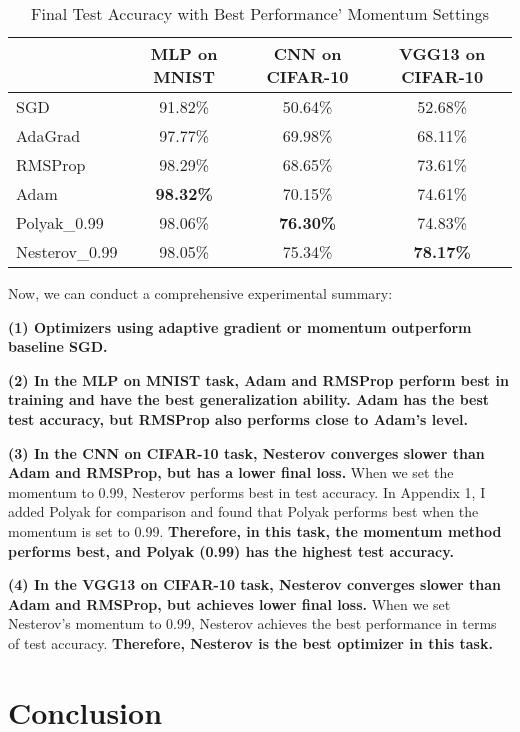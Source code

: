 \documentclass[12pt]{article}
\begin{document}
\begin{table}[H]
\centering
\caption{Final Test Accuracy with Best Performance' Momentum Settings}
\label{tab:comprehensive_comparison}
\begin{tabular}{|l|c|c|c|}
\hline
             & MLP on MNIST & CNN on CIFAR-10 & VGG13 on CIFAR-10 \\ \hline
SGD          & 91.82\%      & 50.64\%         & 52.68\%           \\ \hline
AdaGrad      & 97.77\%      & 69.98\%         & 68.11\%           \\ \hline
RMSProp      & 98.29\%      & 68.65\%         & 73.61\%           \\ \hline
Adam         & \textbf{98.32\%} & 70.15\%         & 74.61\%    \\ \hline
Polyak\_0.99   & 98.06\%      & \textbf{76.30\%}  & 74.83\%           \\ \hline
Nesterov\_0.99 & 98.05\%      & 75.34\%         & \textbf{78.17\%}           \\ \hline
\end{tabular}
\end{table}

Now, we can conduct a comprehensive experimental summary:

\textbf{(1) Optimizers using adaptive gradient or momentum outperform baseline SGD.}

\textbf{(2) In the MLP on MNIST task, Adam and RMSProp perform best in training and have the best generalization ability. Adam has the best test accuracy, but RMSProp also performs close to Adam's level.}

\textbf{(3) In the CNN on CIFAR-10 task, Nesterov converges slower than Adam and RMSProp, but has a lower final loss.} When we set the momentum to 0.99, Nesterov performs best in test accuracy. In Appendix 1, I added Polyak for comparison and found that Polyak performs best when the momentum is set to 0.99. \textbf{Therefore, in this task, the momentum method performs best, and Polyak (0.99) has the highest test accuracy. }

\textbf{(4) In the VGG13 on CIFAR-10 task, Nesterov converges slower than Adam and RMSProp, but achieves lower final loss.} When we set Nesterov's momentum to 0.99, Nesterov achieves the best performance in terms of test accuracy. \textbf{Therefore, Nesterov is the best optimizer in this task.}

\section{Conclusion}
\end{document}
